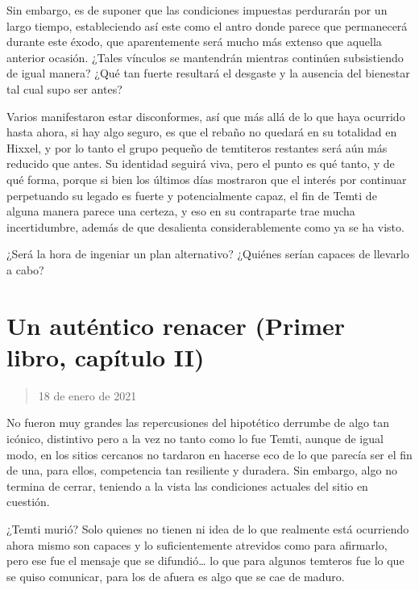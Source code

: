 \documentclass[
]{book}
\begin{document}
Sin embargo, es de suponer que las condiciones impuestas perdurarán por un largo tiempo, estableciendo así este como el antro donde parece que permanecerá durante este éxodo, que aparentemente será mucho más extenso que aquella anterior ocasión. ¿Tales vínculos se mantendrán mientras continúen subsistiendo de igual manera? ¿Qué tan fuerte resultará el desgaste y la ausencia del bienestar tal cual supo ser antes?

Varios manifestaron estar disconformes, así que más allá de lo que haya ocurrido hasta ahora, si hay algo seguro, es que el rebaño no quedará en su totalidad en Hixxel, y por lo tanto el grupo pequeño de temtiteros restantes será aún más reducido que antes. Su identidad seguirá viva, pero el punto es qué tanto, y de qué forma, porque si bien los últimos días mostraron que el interés por continuar perpetuando su legado es fuerte y potencialmente capaz, el fin de Temti de alguna manera parece una certeza, y eso en su contraparte trae mucha incertidumbre, además de que desalienta considerablemente como ya se ha visto.

¿Será la hora de ingeniar un plan alternativo? ¿Quiénes serían capaces de llevarlo a cabo?

\hypertarget{un-autuxe9ntico-renacer-primer-libro-capuxedtulo-ii}{%
\section{Un auténtico renacer (Primer libro, capítulo II)}\label{un-autuxe9ntico-renacer-primer-libro-capuxedtulo-ii}}

\begin{quote}
18 de enero de 2021
\end{quote}

No fueron muy grandes las repercusiones del hipotético derrumbe de algo tan icónico, distintivo pero a la vez no tanto como lo fue Temti, aunque de igual modo, en los sitios cercanos no tardaron en hacerse eco de lo que parecía ser el fin de una, para ellos, competencia tan resiliente y duradera. Sin embargo, algo no termina de cerrar, teniendo a la vista las condiciones actuales del sitio en cuestión.

¿Temti murió? Solo quienes no tienen ni idea de lo que realmente está ocurriendo ahora mismo son capaces y lo suficientemente atrevidos como para afirmarlo, pero ese fue el mensaje que se difundió\ldots{} lo que para algunos temteros fue lo que se quiso comunicar, para los de afuera es algo que se cae de maduro.
\end{document}
